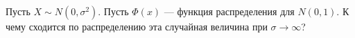 \documentclass[12pt, a4paper, oneside]{article}
\begin{document}



\begin{problem}{ }
Пусть $X \sim N(0, \sigma^2)$. Пусть $\Phi(x)$ — функция распределения для $N(0,1)$. К чему сходится по распределению эта случайная величина при $\sigma \to \infty$? 
\end{problem}





\end{document}
